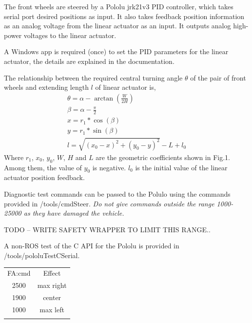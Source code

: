 \documentclass[a4paper]{article}
\begin{document}
The front wheels are steered by a Pololu jrk21v3 PID controller, which takes serial port desired positions as input. It also takes feedback position information as an analog voltage from the linear actuator as an input. It outputs analog high-power voltages to the linear actuator.

A Windows app is required (once) to set the PID parameters for the linear actuator, the details are explained in the documentation. 



The relationship between the required central turning angle $\theta$ of the pair of front wheels and extending length $l$ of linear actuator is,    
\begin{gather}
\theta = \alpha - \arctan(\frac{W}{2H}) \\
\beta = \alpha -\frac{\pi}{2}\\
x = r_1 * \cos(\beta) \\
y = r_1 * \sin(\beta) \\
l = \sqrt{(x_0-x)^2 + (y_0-y)^2} - L + l_0    
\end{gather}    
Where $r_1$, $x_0$, $y_0$, $W$, $H$ and $L$ are the geometric coefficients shown in Fig.1. Among them, the value of $y_0$ is negative. $l_0$ is the initial value of the linear actuator position feedback.


Diagnostic test commands can be passed to the Polulo using the commands provided in /tools/cmdSteer.   {\em Do not give commands outside the range 1000-25000 as they have damaged the vehicle.}  

TODO -- WRITE SAFETY WRAPPER TO LIMIT THIS RANGE..

A non-ROS test of the C API for the Pololu is provided in /tools/pololuTestCSerial.    

\begin{center}
	\begin{tabular}{ c c }
		\hline
		FA:cmd     &  Effect \\
		2500    &    max right  \\
		1900    &    center  \\ 
		1000    &    max left  \\
		\hline\\
	\end{tabular}
\end{center}    
\end{document}
